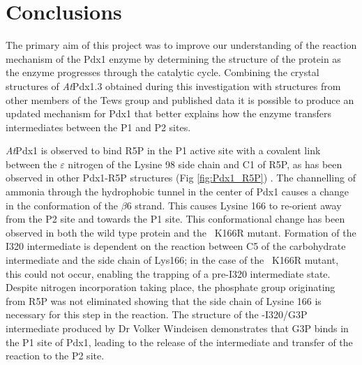 \chapter{Conclusions}\label{ch:Conclusions}

The primary aim of this project was to improve our understanding of the reaction mechanism of the Pdx1 enzyme by determining the structure of the protein as the enzyme progresses through the catalytic cycle. Combining the crystal structures of \textit{At}Pdx1.3 obtained during this investigation with structures from other members of the Tews group and published data it is possible to produce an updated mechanism for Pdx1 that better explains how the enzyme transfers intermediates between the P1 and P2 sites.

\textit{At}Pdx1 is observed to bind R5P in the P1 active site with a covalent link between the $\varepsilon$ nitrogen of the Lysine 98 side chain and C1 of R5P, as has been observed in other Pdx1-R5P structures (Fig \ref{fig:Pdx1_R5P}) \cite{Guedez2012,Smith2015}. The channelling of ammonia through the hydrophobic tunnel in the center of Pdx1 causes a change in the conformation of the $\beta$6 strand. This causes Lysine 166 to re-orient away from the P2 site and towards the P1 site. This conformational change has been observed in both the wild type protein and the \atpdx ~K166R mutant. Formation of the I320 intermediate is dependent on the reaction between C5 of the carbohydrate intermediate and the side chain of Lys166; in the case of the \atpdx ~K166R mutant, this could not occur, enabling the trapping of a pre-I320 intermediate state. Despite nitrogen incorporation taking place, the phosphate group originating from R5P was not eliminated showing that the side chain of Lysine 166 is necessary for this step in the reaction. The structure of the \atpdx -I320/G3P intermediate produced by Dr Volker Windeisen demonstrates that G3P binds in the P1 site of Pdx1, leading to the release of the intermediate and transfer of the reaction to the P2 site.     


